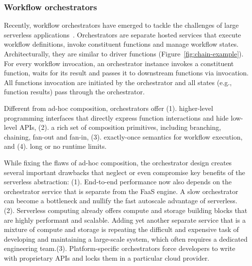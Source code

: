 \subsubsection{Workflow orchestrators}

Recently, workflow orchestrators have emerged to tackle the challenges of
large serverless applications~\cite{excamera, gg-atc, aws-step-functions,
google-cloud-composer, google-workflows, durable-functions}. Orchestrators are
separate hosted services that execute workflow definitions, invoke constituent
functions and manage workflow states. Architecturally, they are similar to
driver functions (Figure~\ref{fig:chain-example}). For every workflow
invocation, an orchestrator instance invokes a constituent function, waits for
its result and passes it to downstream functions via invocation. All functions
invocation are initiated by the orchestrator and all states (e.g., function
results) pass through the orchestrator.

Different from ad-hoc composition, orchestrators offer (1). higher-level
programming interfaces that directly express function interactions and hide
low-level APIs, (2). a rich set of composition primitives, including
branching, chaining, fan-out and fan-in, (3). exactly-once semantics for
workflow execution, and (4). long or no runtime limits.

While fixing the flaws of ad-hoc composition, the orchestrator design creates
several important drawbacks that neglect or even compromise key benefits of
the serverless abstraction: (1). End-to-end performance now also depends on
the orchestrator service that is separate from the FaaS engine. A slow
orchestrator can become a bottleneck and nullify the fast autoscale advantage
of serverless. (2). Serverless computing already offers compute and storage
building blocks that are highly performant and scalable. Adding yet another
separate service that is a mixture of compute and storage is repeating the
difficult and expensive task of developing and maintaining a large-scale system,
which often requires a dedicated engineering team.(3). Platform-specific
orchestrators force developers to write with proprietary APIs and locks them
in a particular cloud provider.

